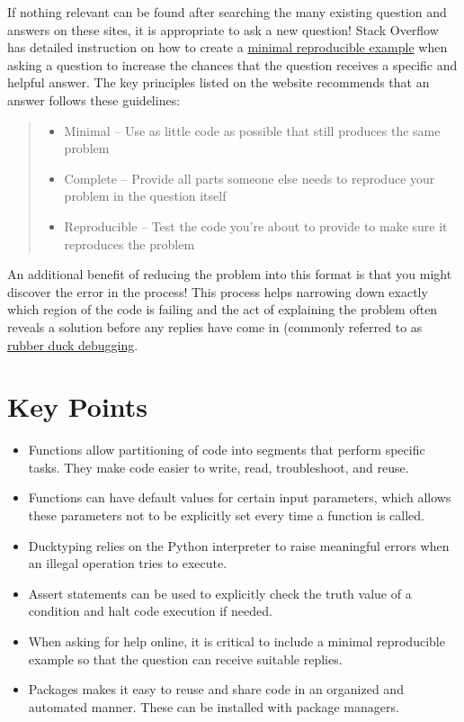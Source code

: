 \documentclass[]{Nemilov}
\providecommand{\tightlist}{%
  \setlength{\itemsep}{0pt}\setlength{\parskip}{0pt}}
\begin{document}
If nothing relevant can be found after searching the many existing question and
answers on these sites, it is appropriate to ask a new question! Stack Overflow
has detailed instruction on how to create a \href{https://stackoverflow.com/help/minimal-reproducible-example}{minimal reproducible
example} when asking a question to increase the chances that the
question receives a specific and helpful answer. The key principles listed on
the website recommends that an answer follows these guidelines:

\begin{quote}
\begin{itemize}
\tightlist
\item
  Minimal -- Use as little code as possible that still produces the same
  problem
\item
  Complete -- Provide all parts someone else needs to reproduce your problem
  in the question itself
\item
  Reproducible -- Test the code you're about to provide to make sure it
  reproduces the problem
\end{itemize}
\end{quote}

An additional benefit of reducing the problem into this format is that you
might discover the error in the process! This process helps narrowing down
exactly which region of the code is failing and the act of explaining the
problem often reveals a solution before any replies have come in (commonly
referred to as \href{https://en.wikipedia.org/wiki/Rubber_duck_debugging}{rubber duck debugging}.

\hypertarget{py-dev-keypoints}{%
\section{Key Points}\label{py-dev-keypoints}}

\begin{itemize}
\tightlist
\item
  Functions allow partitioning of code into segments that perform specific
  tasks. They make code easier to write, read, troubleshoot, and reuse.
\item
  Functions can have default values for certain input parameters, which
  allows these parameters not to be explicitly set every time a function is
  called.
\item
  Ducktyping relies on the Python interpreter to raise meaningful errors when
  an illegal operation tries to execute.
\item
  Assert statements can be used to explicitly check the truth value of
  a condition and halt code execution if needed.
\item
  When asking for help online, it is critical to include a minimal reproducible
  example so that the question can receive suitable replies.
\item
  Packages makes it easy to reuse and share code in an organized and automated
  manner. These can be installed with package managers.
\end{itemize}
\end{document}
